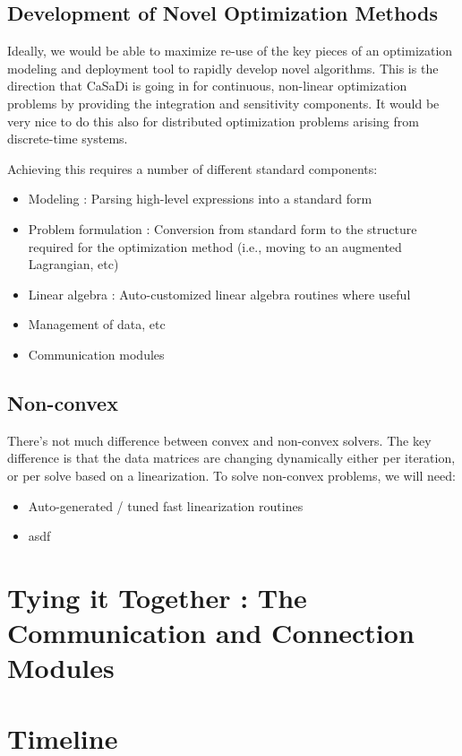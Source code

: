\documentclass[11pt,a4paper]{article}
\begin{document}
\subsection{Development of Novel Optimization Methods}
Ideally, we would be able to maximize re-use of the key pieces of an optimization modeling and deployment tool to rapidly develop novel algorithms. This is the direction that CaSaDi is going in for continuous, non-linear optimization problems by providing the integration and sensitivity components. It would be very nice to do this also for distributed optimization problems arising from discrete-time systems.

Achieving this requires a number of different standard components:
\begin{itemize}
  \item Modeling : Parsing high-level expressions into a standard form
  \item Problem formulation : Conversion from standard form to the structure required for the optimization method (i.e., moving to an augmented Lagrangian, etc)
  \item Linear algebra : Auto-customized linear algebra routines where useful
  \item Management of data, etc
  \item Communication modules
\end{itemize}

\subsection{Non-convex}
There's not much difference between convex and non-convex solvers. The key difference is that the data matrices are changing dynamically either per iteration, or per solve based on a linearization. To solve non-convex problems, we will need:
\begin{itemize}
  \item Auto-generated / tuned fast linearization routines
  \item asdf
\end{itemize}


\section{Tying it Together : The Communication and Connection Modules}



\section{Timeline}
\end{document}
